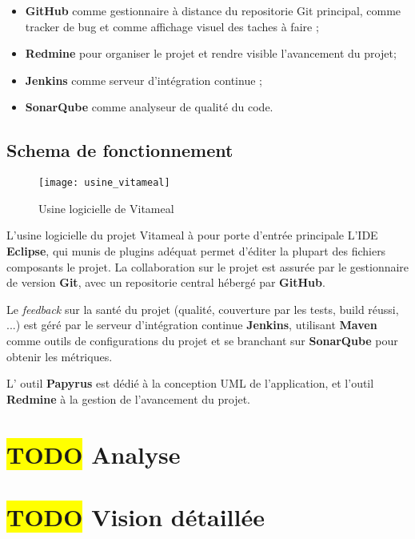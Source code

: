 \begin{itemize}
	\item \textbf{GitHub} comme gestionnaire à distance du repositorie Git principal, comme tracker de bug et comme affichage visuel des taches à faire ;
	\item \textbf{Redmine} pour organiser le projet et rendre visible l'avancement du projet;
	\item \textbf{Jenkins} comme serveur d'intégration continue ;
	\item \textbf{SonarQube} comme analyseur de qualité du code.
\end{itemize}

\subsection{Schema de fonctionnement}

\begin{figure}[H]
	\label{Usine logicielle de Vitameal}
	\centering
	\texttt{[image: usine\_vitameal]} %
	\caption{Usine logicielle de Vitameal}
\end{figure}


L'usine logicielle du projet Vitameal à pour porte d'entrée principale L'IDE  \textbf{Eclipse}, qui munis de plugins adéquat permet d'éditer la plupart des fichiers composants le projet.  
La collaboration sur le projet est assurée par le gestionnaire de version  \textbf{Git}, avec un repositorie central hébergé par \textbf{GitHub}.

Le  \textit{feedback} sur la santé du projet (qualité, couverture par les tests, build réussi, ...) est géré par le serveur d'intégration continue  \textbf{Jenkins}, utilisant \textbf{Maven} comme outils de configurations du projet et se branchant sur \textbf{SonarQube} pour obtenir les métriques.

L' outil  \textbf{Papyrus} est dédié à la conception UML de l'application, et l'outil  \textbf{Redmine} à la gestion de l'avancement du projet.

\section{\colorbox{yellow}{TODO} Analyse}

\section{\colorbox{yellow}{TODO} Vision détaillée}

